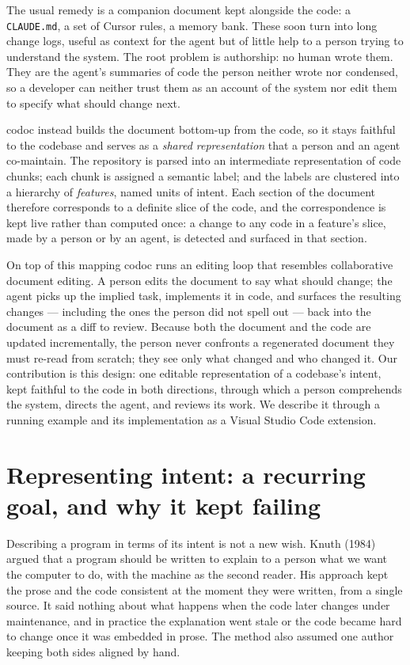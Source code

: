 \documentclass[sigconf,nonacm]{acmart}
\begin{document}
The usual remedy is a companion document kept alongside the code: a
\texttt{CLAUDE.md}, a set of Cursor rules, a memory bank. These soon turn into
long change logs, useful as context for the agent but of little help to a person
trying to understand the system. The root problem is authorship: no human wrote
them. They are the agent's summaries of code the person neither wrote nor
condensed, so a developer can neither trust them as an account of the system nor
edit them to specify what should change next.

codoc instead builds the document bottom-up from the code, so it stays faithful to
the codebase and serves as a \emph{shared representation} that a person and an
agent co-maintain. The repository is parsed into an
intermediate representation of code chunks; each chunk is assigned a semantic
label; and the labels are clustered into a hierarchy of \emph{features}, named
units of intent. Each section of the document therefore corresponds to a definite
slice of the code, and the correspondence is kept live rather than computed once:
a change to any code in a feature's slice, made by a person or by an agent, is
detected and surfaced in that section.

On top of this mapping codoc runs an editing loop that resembles collaborative
document editing. A person edits the document to say what should change; the agent
picks up the implied task, implements it in code, and surfaces the resulting
changes --- including the ones the person did not spell out --- back into the
document as a diff to review. Because both the document and the code are updated
incrementally, the person never confronts a regenerated document they must
re-read from scratch; they see only what changed and who changed it. Our
contribution is this design: one editable representation of a codebase's intent,
kept faithful to the code in both directions, through which a person comprehends
the system, directs the agent, and reviews its work. We describe it through a
running example and its implementation as a Visual Studio Code extension.

\section{Representing intent: a recurring goal, and why it kept failing}

Describing a program in terms of its intent is not a new wish. Knuth (1984) argued
that a program should be written to explain to a person what we want the computer
to do, with the machine as the second reader. His approach kept the prose and the
code consistent at the moment they were written, from a single source. It said
nothing about what happens when the code later changes under maintenance, and in
practice the explanation went stale or the code became hard to change once it was
embedded in prose. The method also assumed one author keeping both sides aligned
by hand.
\end{document}

